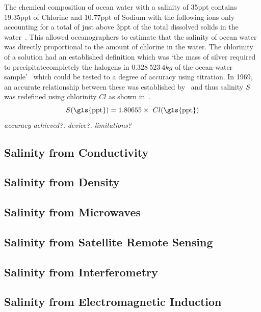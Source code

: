 The chemical composition of ocean water with a salinity of 35\gls{ppt} contains 19.35\gls{ppt} of Chlorine and 10.77\gls{ppt} of Sodium with the following ions only accounting for a total of just above 3\gls{ppt} of the total dissolved solids in the water~\cite{britannica_seawater_encyclopaedia_2024}.
This allowed oceanographers to estimate that the salinity of ocean water was directly proportional to the amount of chlorine in the water.
The chlorinity of a solution had an established definition which was `the mass of silver required to precipitatecompletely the halogens in $0.328\ 523\ 4 kg$ of the ocean-water sample'~\cite{wooster_redefinition_of_salinity_1969} which could be tested to a degree of accuracy using titration.
In 1969, an accurate relationship between these was established by~ and thus salinity $S$ was redefined using chlorinity $Cl$ as shown in~.
\begin{equation}\label{eq:salinity-chlorinity}
    S (\text{\gls{ppt}}) = 1.80655 \times~Cl (\text{\gls{ppt}})
\end{equation}
\textit{accuracy achieved?, device?, limitations?}

\subsection{Salinity from Conductivity}\label{subsec:salinity-from-conductivity}

\subsection{Salinity from Density}

\subsection{Salinity from Microwaves}

\subsection{Salinity from Satellite Remote Sensing}

\subsection{Salinity from Interferometry}

\subsection{Salinity from Electromagnetic Induction}

